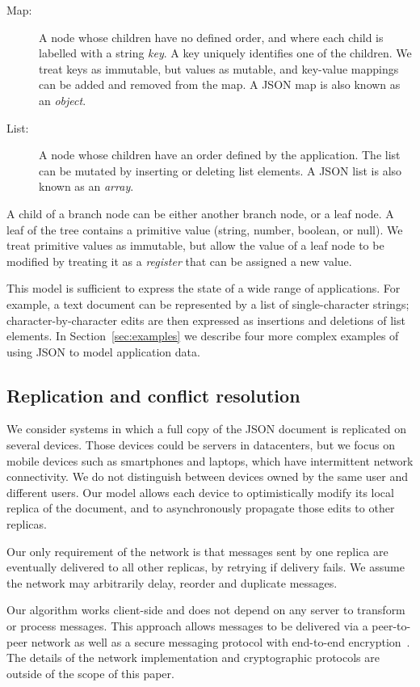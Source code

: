 \documentclass[10pt,journal,compsoc]{IEEEtran}
\begin{document}
\begin{description}
\item[Map:] A node whose children have no defined order, and where each child is labelled with a string \emph{key}. A key uniquely identifies one of the children. We treat keys as immutable, but values as mutable, and key-value mappings can be added and removed from the map. A JSON map is also known as an \emph{object}.
\item[List:] A node whose children have an order defined by the application. The list can be mutated by inserting or deleting list elements. A JSON list is also known as an \emph{array}.
\end{description}

A child of a branch node can be either another branch node, or a leaf node. A leaf of the tree contains a primitive value (string, number, boolean, or null). We treat primitive values as immutable, but allow the value of a leaf node to be modified by treating it as a \emph{register} that can be assigned a new value.

This model is sufficient to express the state of a wide range of applications. For example, a text document can be represented by a list of single-character strings; character-by-character edits are then expressed as insertions and deletions of list elements. In Section~\ref{sec:examples} we describe four more complex examples of using JSON to model application data.

\subsection{Replication and conflict resolution}\label{sec:intro-replication}

We consider systems in which a full copy of the JSON document is replicated on several devices. Those devices could be servers in datacenters, but we focus on mobile devices such as smartphones and laptops, which have intermittent network connectivity. We do not distinguish between devices owned by the same user and different users. Our model allows each device to optimistically modify its local replica of the document, and to asynchronously propagate those edits to other replicas.

Our only requirement of the network is that messages sent by one replica are eventually delivered to all other replicas, by retrying if delivery fails. We assume the network may arbitrarily delay, reorder and duplicate messages.

Our algorithm works client-side and does not depend on any server to transform or process messages. This approach allows messages to be delivered via a peer-to-peer network as well as a secure messaging protocol with end-to-end encryption~\cite{Unger:2015kg}. The details of the network implementation and cryptographic protocols are outside of the scope of this paper.
\end{document}

